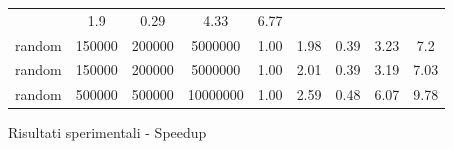 \begin{figure*}[t]
{\begin{tabular}{lS[table-format=7.0] S[table-format=7.0] S[table-format=8.0] S[table-format=4.2] S[table-format=4.2] S[table-format=4.2] S[table-format=4.2] S[table-format=4.2]}
        & 1.9	
        & 0.29	
        & 4.33	
        & 6.77 \\
    random
        & 150000	
        & 200000	
        & 5000000	
        & 1.00	
        & 1.98	
        & 0.39	
        & 3.23	
        & 7.2 \\
    random
        & 150000	
        & 200000	
        & 5000000	
        & 1.00	
        & 2.01	
        & 0.39	
        & 3.19	
        & 7.03 \\
    random
        & 500000	
        & 500000	
        & 10000000	
        & 1.00	
        & 2.59	
        & 0.48	
        & 6.07	
        & 9.78 \\ \bottomrule
    \end{tabular}}
    \caption{Risultati sperimentali -  Speedup}
    \label{results_speedup}
\end{figure*}



